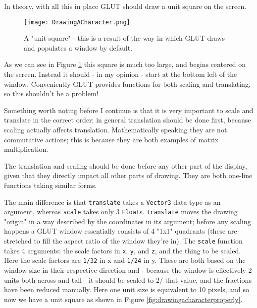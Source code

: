 \documentclass[12pt, a4paper]{report}
\begin{document}
In theory, with all this in place GLUT should draw a unit square on the screen.

\begin{figure}[ht]
  \centering
  \caption{A "unit square" - this is a result of the way in which GLUT draws and populates a window by default.}
  \texttt{[image: DrawingACharacter.png]}
  \label{fig:drawingacharacter}
\end{figure}

As we can see in Figure \ref{fig:drawingacharacter} this square is much too large, and begins centered on the screen.
Instead it should - in my opinion - start at the bottom left of the window.
Conveniently GLUT provides functions for both scaling and translating, so this shouldn't be a problem!

\par

Something worth noting before I continue is that it is very important to scale and translate in the correct order; in general translation should be done first, because scaling actually affects translation.
Mathematically speaking they are not commutative actions; this is because they are both examples of matrix multiplication.

\par

The translation and scaling should be done before any other part of the display, given that they directly impact all other parts of drawing.
They are both one-line functions taking similar forms.

The main difference is that \verb|translate| takes a \verb|Vector3| data type as an argument, whereas \verb|scale| takes only 3 \verb|Float|s.
\verb|translate| moves the drawing "origin" in a way described by the coordinates in its argument; before any scaling happens a GLUT window essentially consists of 4 "1x1" quadrants (these are stretched to fill the aspect ratio of the window they're in).
The \verb|scale| function takes 4 arguments: the scale factors in \verb|x|, \verb|y|, and \verb|z|, and the thing to be scaled.
Here the scale factors are \verb|1/32| in x and \verb|1/24| in y.
These are both based on the window size in their respective direction and - because the window is effectively 2 units both across and tall - it should be scaled to $2/$ that value, and the fractions have been reduced manually.
Here one unit size is equivalent to 10 pixels, and so now we have a unit square as shown in Figure \ref{fig:drawingacharacterproperly}.
\end{document}

